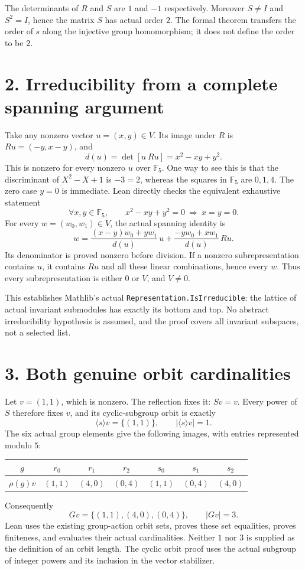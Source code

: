 \documentclass[10pt]{article}
\newcommand{\F}{\mathbb F_5}
\begin{document}
The determinants of $R$ and $S$ are $1$ and $-1$ respectively. Moreover $S\ne I$ and $S^2=I$, hence the matrix $S$ has actual order $2$. The formal theorem transfers the order of $s$ along the injective group homomorphism; it does not define the order to be $2$.

\section*{2. Irreducibility from a complete spanning argument}
Take any nonzero vector $u=(x,y)\in V$. Its image under $R$ is $Ru=(-y,x-y)$, and
\[
d(u)=\det[u\ Ru]=x^2-xy+y^2.
\]
This is nonzero for every nonzero $u$ over $\F$. One way to see this is that the discriminant of $X^2-X+1$ is $-3=2$, whereas the squares in $\F$ are $0,1,4$. The zero case $y=0$ is immediate. Lean directly checks the equivalent exhaustive statement
\[
\forall x,y\in\F,\qquad x^2-xy+y^2=0\ \Longrightarrow\ x=y=0.
\]
For every $w=(w_0,w_1)\in V$, the actual spanning identity is
\[
w=\frac{(x-y)w_0+yw_1}{d(u)}\,u+
  \frac{-yw_0+xw_1}{d(u)}\,Ru.
\]
Its denominator is proved nonzero before division. If a nonzero subrepresentation contains $u$, it contains $Ru$ and all these linear combinations, hence every $w$. Thus every subrepresentation is either $0$ or $V$, and $V\ne0$.

This establishes Mathlib's actual \texttt{Representation.IsIrreducible}: the lattice of actual invariant submodules has exactly its bottom and top. No abstract irreducibility hypothesis is assumed, and the proof covers all invariant subspaces, not a selected list.

\section*{3. Both genuine orbit cardinalities}
Let $v=(1,1)$, which is nonzero. The reflection fixes it: $Sv=v$. Every power of $S$ therefore fixes $v$, and its cyclic-subgroup orbit is exactly
\[
\langle s\rangle v=\{(1,1)\},\qquad |\langle s\rangle v|=1.
\]
The six actual group elements give the following images, with entries represented modulo $5$:
\begin{center}
\begin{tabular}{c|cccccc}
\toprule
$g$ & $r_0$ & $r_1$ & $r_2$ & $s_0$ & $s_1$ & $s_2$\\
\midrule
$\rho(g)v$ & $(1,1)$ & $(4,0)$ & $(0,4)$ & $(1,1)$ & $(0,4)$ & $(4,0)$\\
\bottomrule
\end{tabular}
\end{center}
Consequently
\[
Gv=\{(1,1),(4,0),(0,4)\},\qquad |Gv|=3.
\]
Lean uses the existing group-action orbit sets, proves these set equalities, proves finiteness, and evaluates their actual cardinalities. Neither $1$ nor $3$ is supplied as the definition of an orbit length. The cyclic orbit proof uses the actual subgroup of integer powers and its inclusion in the vector stabilizer.
\end{document}
